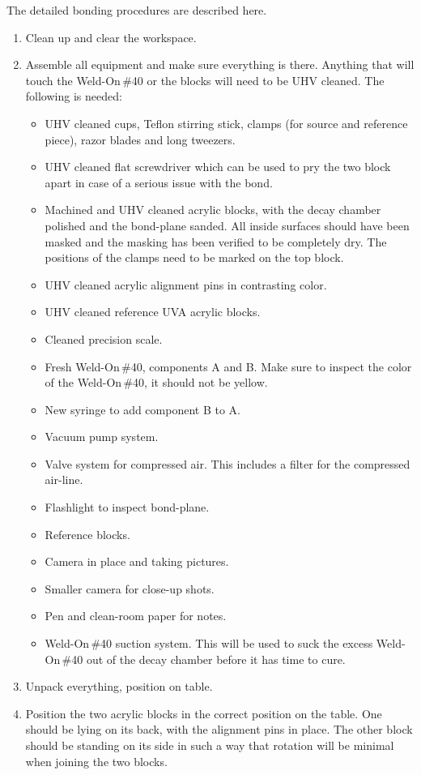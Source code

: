 The detailed bonding procedures are described here. 
\begin{enumerate}
\item Clean up and clear the workspace.  
\item Assemble all equipment and make sure everything is there. Anything that will touch the Weld-On\,\#40 or the blocks will need to be UHV cleaned. The following is needed:
\begin{itemize}
\item UHV cleaned cups, Teflon stirring stick, clamps (for source and reference piece), razor blades and long tweezers.
\item UHV cleaned flat screwdriver which can be used to pry the two block apart in case of a serious issue with the bond.
\item Machined and UHV cleaned acrylic blocks, with the decay chamber polished and the bond-plane sanded. All inside surfaces should have been masked and the masking has been verified to be completely dry. The positions of the clamps need to be marked on the top block.
\item UHV cleaned acrylic alignment pins in contrasting color.
\item UHV cleaned reference UVA acrylic blocks.
\item Cleaned precision scale.
\item Fresh Weld-On\,\#40, components A and B. Make sure to inspect the color of the Weld-On\,\#40, it should not be yellow. 
\item New syringe to add component B to A.
\item Vacuum pump system.
\item Valve system for compressed air. This includes a filter for the compressed air-line.
\item Flashlight to inspect bond-plane.
\item Reference blocks.
\item Camera in place and taking pictures.
\item Smaller camera for close-up shots.
\item Pen and clean-room paper for notes.
\item Weld-On\,\#40 suction system. This will be used to suck the excess Weld-On\,\#40 out of the decay chamber before it has time to cure. 
\end{itemize}
\item Unpack everything, position on table.
\item Position the two acrylic blocks in the correct position on the table. One should be lying on its back, with the alignment pins in place. The other block should be standing on its side in such a way that rotation will be minimal when joining the two blocks.

\end{enumerate}
